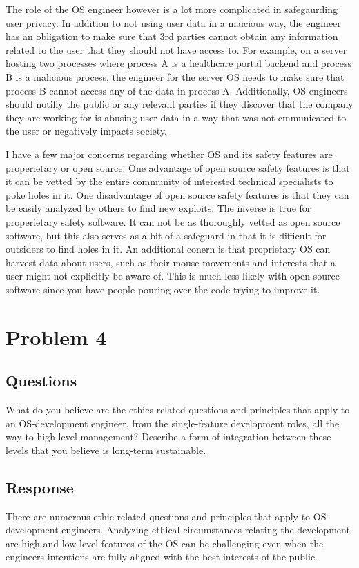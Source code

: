 \documentclass{assignment-x}
\begin{document}
The role of the OS engineer however is a lot more complicated in safegaurding user privacy. In addition to not using user data in a maicious way, the engineer has an obligation to make sure that 3rd parties cannot obtain any information related to the user that they should not have access to. For example, on a server hosting two processes where process A is a healthcare portal backend and process B is a malicious process, the engineer for the server OS needs to make sure that process B cannot access any of the data in process A. Additionally, OS engineers should notifiy the public or any relevant parties if they discover that the company they are working for is abusing user data in a way that was not cmmunicated to the user or negatively impacts society.

I have a few major concerns regarding whether OS and its safety features are properietary or open source. One advantage of open source  safety features is that it can  be vetted by the entire community of interested technical specialists to poke holes in it.  One disadvantage of open source safety features is that they can be easily analyzed by others to find new exploits. The inverse is true for properietary safety software. It can not be as thoroughly vetted as open source software, but this also serves as a bit of a safeguard in that it is difficult for outsiders to find holes in it. An additional conern is that proprietary OS can harvest data about users, such as their mouse movements and interests that a user might not explicitly be aware of. \cite{hackernews_windows10_privacy} This is much less likely with open source software since you have people pouring over the code trying to improve it.

\section{Problem 4}
\subsection{Questions}
What do you believe are the ethics-related questions and principles that apply to an OS-development engineer, from the single-feature development roles, all the way to high-level management?
Describe a form of integration between these levels that you believe is long-term sustainable.
\subsection{Response}
There are numerous ethic-related questions and principles that apply to OS-development engineers. Analyzing ethical circumstances relating the development are high and low level features of the OS can be challenging even when the engineers intentions are fully aligned with the best interests of the public. 
\end{document}
